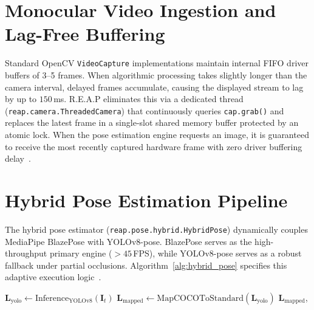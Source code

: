 \documentclass[12pt]{report}
\begin{document}
\section{Monocular Video Ingestion and Lag-Free Buffering}
Standard OpenCV \texttt{VideoCapture} implementations maintain internal FIFO driver buffers of 3--5 frames. When algorithmic processing takes slightly longer than the camera interval, delayed frames accumulate, causing the displayed stream to lag by up to $150$\,ms. R.E.A.P eliminates this via a dedicated thread (\texttt{reap.camera.ThreadedCamera}) that continuously queries \texttt{cap.grab()} and replaces the latest frame in a single-slot shared memory buffer protected by an atomic lock. When the pose estimation engine requests an image, it is guaranteed to receive the most recently captured hardware frame with zero driver buffering delay~\cite{lewin2017mobile}.

\section{Hybrid Pose Estimation Pipeline}
The hybrid pose estimator (\texttt{reap.pose.hybrid.HybridPose}) dynamically couples MediaPipe BlazePose with YOLOv8-pose. BlazePose serves as the high-throughput primary engine ($>45$\,FPS), while YOLOv8-pose serves as a robust fallback under partial occlusions. Algorithm~\ref{alg:hybrid_pose} specifies this adaptive execution logic~\cite{bazarevsky2020blazepose, maji2022yolopose}.

\begin{algorithm}[H]
\SetAlFnt{\footnotesize}
\DontPrintSemicolon
\SetAlgoLined
{}

$\mathbf{L}_{\text{yolo}} \leftarrow \text{Inference}_{\text{YOLOv8}}(\mathbf{I}_t)$\;
$\mathbf{L}_{\text{mapped}} \leftarrow \text{MapCOCOToStandard}(\mathbf{L}_{\text{yolo}})$\;
\Return $\mathbf{L}_{\text{mapped}}$, \;
\caption{Hybrid Pose Inference and Resilient Failover}
\label{alg:hybrid_pose}
\end{algorithm}
\end{document}
